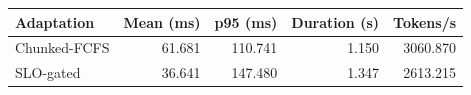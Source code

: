\begin{tabular}{lrrrr}\toprule
Adaptation & Mean (ms) & p95 (ms) & Duration (s) & Tokens/s \\ \midrule
Chunked-FCFS & 61.681 & 110.741 & 1.150 & 3060.870 \\
SLO-gated & 36.641 & 147.480 & 1.347 & 2613.215 \\
\bottomrule\end{tabular}
